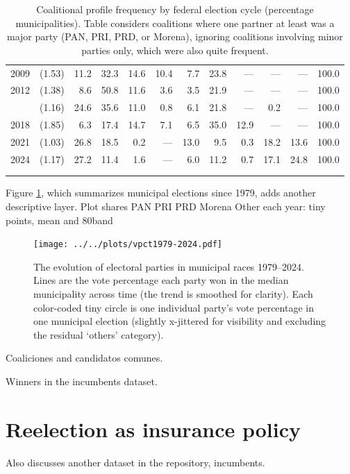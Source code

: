 \documentclass[letter,12pt]{article}
\begin{document}
\begin{table}
{\begin{tabular}{r|c|rrrrrrrrrr}
 2009& (1.53)&  11.2&  32.3&   14.6&   10.4&    7.7&      23.8&         ---&  ---&       ---& 100.0\\
 2012& (1.38)&   8.6&  50.8&   11.6&    3.6&    3.5&      21.9&         ---&  ---&       ---& 100.0\\ \hdashline
 2015& (1.16)&  24.6&  35.6&   11.0&    0.8&    6.1&      21.8&         ---&  0.2&       ---& 100.0\\
 2018& (1.85)&   6.3&  17.4&   14.7&    7.1&    6.5&      35.0&        12.9&  ---&       ---& 100.0\\
 2021& (1.03)&  26.8&  18.5&    0.2&    ---&   13.0&       9.5&         0.3& 18.2&      13.6& 100.0\\
 2024& (1.17)&  27.2&  11.4&    1.6&    ---&    6.0&      11.2&         0.7& 17.1&      24.8& 100.0\\ 
     &       &      &      &       &       &       &          &            &     &          &      \\ [-1.8ex] 
  \hline \\[-1.8ex] 
\end{tabular}
}
\caption{Coalitional profile frequency by federal election cycle (percentage municipalities). Table considers coalitions where one partner at least was a major party (PAN, PRI, PRD, or Morena), ignoring coalitions involving minor parties only, which were also quite frequent.}\label{T:coal}
\end{table}

Figure \ref{F:vpcts}, which summarizes municipal elections since 1979, adds another descriptive layer. Plot shares PAN PRI PRD Morena Other each year: tiny points, mean and 80band 

\begin{figure}
  \texttt{[image: ../../plots/vpct1979-2024.pdf]}
  \caption{The evolution of electoral parties in municipal races 1979--2024. Lines are the vote percentage each party won in the median municipality across time (the trend is smoothed for clarity). Each color-coded tiny circle is one individual party's vote percentage in one municipal election (slightly x-jittered for visibility and excluding the residual `others' category).}\label{F:vpcts}
\end{figure}  



Coaliciones and candidatos comunes.

Winners in the incumbents dataset. 

\section{Reelection as insurance policy}
Also discusses another dataset in the repository, incumbents.
\end{document}
